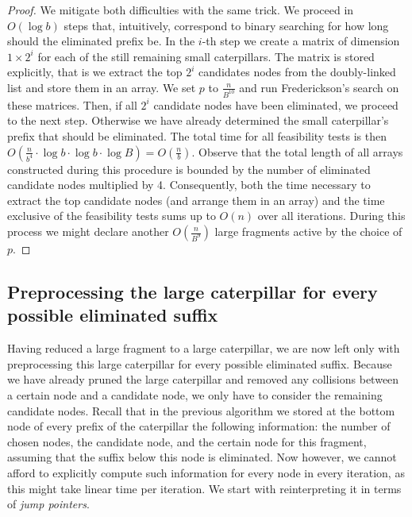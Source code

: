 \documentclass[a4paper,UKenglish]{lipics-v2016}
\theoremstyle{plain}
\begin{document}
\begin{proof}
We mitigate both difficulties with the same trick. We proceed in $O(\log b)$ steps that, intuitively, correspond
to binary searching for how long should the eliminated prefix be. In the $i$-th step we
create a matrix of dimension $1\times 2^{i}$ for each of the still remaining small caterpillars.
The matrix is stored explicitly, that is we extract the top $2^{i}$ candidates nodes from the doubly-linked
list and store them in an array. We set $p$ to $\frac{n}{B^{10}}$ and run Frederickson's search
on these matrices. Then, if all $2^{i}$ candidate nodes have been eliminated, we proceed to the next
step. Otherwise we have already determined the small caterpillar's prefix that should be eliminated. The total time for all feasibility tests is then
$O(\frac{n}{b^{4}}\cdot \log b \cdot \log b \cdot \log B) = O(\frac{n}{b})$. 
Observe that the total length of all arrays constructed during this procedure is bounded by the number
of eliminated candidate nodes multiplied by 4. Consequently, both the time necessary
to extract the top candidate nodes (and arrange them in an array) and the time exclusive of the feasibility tests sums up to $O(n)$
over all iterations. During this process we might declare another $O(\frac{n}{B^9})$ large fragments active
by the choice of $p$.
\end{proof}


\subsection{Preprocessing the large caterpillar for every possible eliminated suffix}\label{section:lemma4}

Having reduced a large fragment to a large caterpillar, we are now left only with preprocessing this large caterpillar for every possible eliminated suffix.
Because we have already pruned the large caterpillar and removed any collisions between a certain
node and a candidate node, we only have to consider the remaining candidate nodes.
Recall that in the previous algorithm we stored at the bottom node of every prefix of the caterpillar
the following information: the number of chosen nodes, the candidate node, and the certain node for this fragment,
assuming that the suffix below this node is eliminated. Now however, we cannot afford to explicitly
compute such information for every node in every iteration,
as this might take linear time per iteration. We start with reinterpreting it in terms of
\emph{jump pointers}. 
\end{document}
